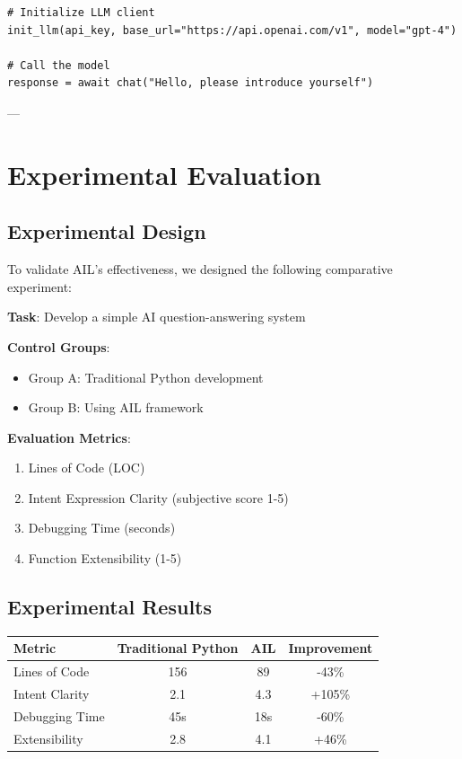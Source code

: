 \documentclass[12pt,a4paper]{article}
\begin{document}
\begin{verbatim}
# Initialize LLM client
init_llm(api_key, base_url="https://api.openai.com/v1", model="gpt-4")

# Call the model
response = await chat("Hello, please introduce yourself")
\end{verbatim}

---

\section{Experimental Evaluation}

\subsection{Experimental Design}

To validate AIL's effectiveness, we designed the following comparative experiment:

\textbf{Task}: Develop a simple AI question-answering system

\textbf{Control Groups}:
\begin{itemize}
\item Group A: Traditional Python development
\item Group B: Using AIL framework
\end{itemize}

\textbf{Evaluation Metrics}:
\begin{enumerate}
\item Lines of Code (LOC)
\item Intent Expression Clarity (subjective score 1-5)
\item Debugging Time (seconds)
\item Function Extensibility (1-5)
\end{enumerate}

\subsection{Experimental Results}

\begin{table}[htbp]
\centering
\begin{tabular}{lccc}
\toprule
Metric & Traditional Python & AIL & Improvement \\
\midrule
Lines of Code & 156 & 89 & -43\% \\
Intent Clarity & 2.1 & 4.3 & +105\% \\
Debugging Time & 45s & 18s & -60\% \\
Extensibility & 2.8 & 4.1 & +46\% \\
\bottomrule
\end{tabular}
\end{table}
\end{document}

